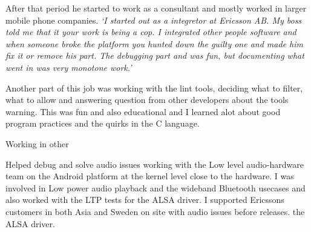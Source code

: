 \documentclass{article}
\begin{document}
\begin{multicols}{3}
{    After that period he started to work as a consultant and mostly worked in 
    larger mobile phone companies. \textit{`I started out as a integretor at Ericsson 
    AB. My boss told me that it your work is being a cop. I integrated other
    people software and when someone broke the platform you hunted down the
    guilty one and made him fix it or remove his part. The debugging part and
    was fun, but documenting what went in was very monotone work.'} 

    Another part of this job was working with the lint tools, deciding what to 
    filter, what to allow and answering question from other developers about 
    the tools warning. This was fun and also educational and I learned alot
    about good program practices and the quirks in the C language.

    Working in other  
}

\end{multicols}



\sepspace


\sepspace

  {Helped debug and solve audio issues working with the Low level
    audio-hardware team on the Android platform at the kernel level close to
    the hardware. I was involved in Low power audio playback and the wideband
    Bluetooth usecases and also worked with the LTP tests for the ALSA driver. 
  I supported Ericssons customers in both Asia and Sweden on site with audio
  issues before releases. 
  the ALSA driver.}
\sepspace
\end{document}
